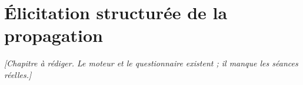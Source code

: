 \chapter{Élicitation structurée de la propagation}
\label{ch:elicitation}

\textit{[Chapitre à rédiger. Le moteur et le questionnaire existent ; il manque les
séances réelles.]}

%
